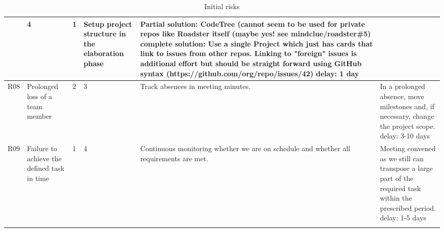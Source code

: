 \begin{center}
\begin{longtable}{|p{6mm}|p{30mm}|p{6mm}|p{8mm}|p{30mm}|p{64mm}|}
		& \cellcolor{green!50}4
		& \cellcolor{green!50}1
		& Setup project structure in the elaboration phase
		& Partial solution: \newline CodeTree (cannot seem to be used for private repos like Roadster itself (maybe yes! see  mindclue/roadster\#5) \newline
		\newline complete solution: \newline Use a single Project which just has cards that link to issues from other repos.
		Linking to "foreign" issues is additional effort but should be straight forward using GitHub syntax (https://github.com/org/repo/issues/42)
		\newline delay: 1 day \\ \hline
	R08
		& Prolonged loss of a team member
		& \cellcolor{green!50}2
		& \cellcolor{green!50}3
		& Track absences in meeting minutes.
		& In a prolonged absence, move milestones and, if necessary, change the project scope. \newline delay: 3-10 days \\ \hline

	R09
		& Failure to achieve the defined task in time
		& \cellcolor{green!50}1
		& \cellcolor{green!50}4
		& Continuous monitoring whether we are on schedule and whether all requirements are met.
		& Meeting convened as we still can transpose a large part of the required task within the prescribed period. \newline delay: 1-5 days\\ \hline
   \caption{Initial risks} \label{tab:init-risks} \\
   \end{longtable}
\end{center}

